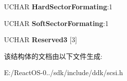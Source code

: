 \begin{DoxyCompactItemize}
\mbox{\label{struct___m_o_d_e___f_o_r_m_a_t___p_a_g_e_a07224cec18d9f8ef6dba843107b13a56}} 
U\+C\+H\+AR {\bfseries Hard\+Sector\+Formating}\+:1
\item 
\mbox{\label{struct___m_o_d_e___f_o_r_m_a_t___p_a_g_e_ad301ce3c3a47bce254e69471284ecf2c}} 
U\+C\+H\+AR {\bfseries Soft\+Sector\+Formating}\+:1
\item 
\mbox{\label{struct___m_o_d_e___f_o_r_m_a_t___p_a_g_e_a4ba6cd47743ec364353cf8a73f87fd6e}} 
U\+C\+H\+AR {\bfseries Reserved3} \mbox{[}3\mbox{]}
\end{DoxyCompactItemize}


该结构体的文档由以下文件生成\+:\begin{DoxyCompactItemize}
\item 
E\+:/\+React\+O\+S-\/0../sdk/include/ddk/scsi.\+h\end{DoxyCompactItemize}
